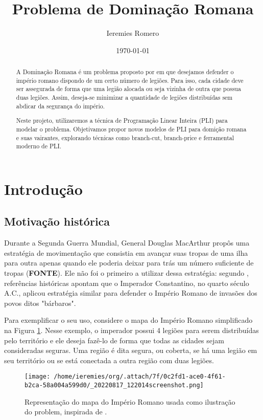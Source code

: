 \documentclass[11pt]{article}
\author{Ieremies Romero}
\date{\today}
\title{Problema de Dominação Romana}
\begin{document}
\maketitle
\begin{abstract}
A Dominação Romana é um problema proposto por \autocite{stewart1999DefendRomanEmpire} em que desejamos defender o império romano dispondo de um certo número de legiões. Para isso, cada cidade deve ser assegurada de forma que uma legião alocada ou seja vizinha de outra que possua duas legiões. Assim, deseja-se minimizar a quantidade de legiões distribuídas sem abdicar da segurança do império.

Neste projeto, utilizaremos a técnica de Programação Linear Inteira (PLI) para modelar o problema. Objetivamos propor novos modelos de PLI para domição romana e suas vairantes, explorando técnicas como branch-cut, branch-price e ferramental moderno de PLI.
\end{abstract}

\section{Introdução}
\label{sec:orgfa357c9}
\subsection{Motivação histórica}
\label{sec:org56d74b8}
Durante a Segunda Guerra Mundial, General Douglas MacArthur propôs uma estratégia de movimentação que consistia em avançar suas tropas de uma ilha para outra apenas quando ele poderia deixar para trás um número suficiente de tropas (\textbf{FONTE}). Ele não foi o primeiro a utilizar dessa estratégia: segundo \autocite{stewart1999DefendRomanEmpire}, referências históricas apontam que o Imperador Constantino, no quarto século A.C., aplicou estratégia similar para defender o Império Romano de invasões dos povos ditos "bárbaros".

Para exemplificar o seu uso, considere o mapa do Império Romano simplificado na Figura \ref{fig:mapa}. Nesse exemplo, o imperador possui 4 legiões para serem distribuídas pelo território e ele deseja fazê-lo de forma que todas as cidades sejam consideradas seguras. Uma região é dita segura, ou coberta, se há uma legião em seu território ou se está conectada a outra região com duas legiões.

\begin{figure}[htbp]
\centering
\texttt{[image: /home/ieremies/org/.attach/7f/0c2fd1-ace0-4f61-b2ca-58a004a599d0/\_20220817\_122014screenshot.png]}
\caption{\label{fig:mapa}Representação do mapa do Império Romano usada como ilustração do problem, inspirada de \autocite{stewart1999DefendRomanEmpire}.}
\end{figure}
\end{document}
